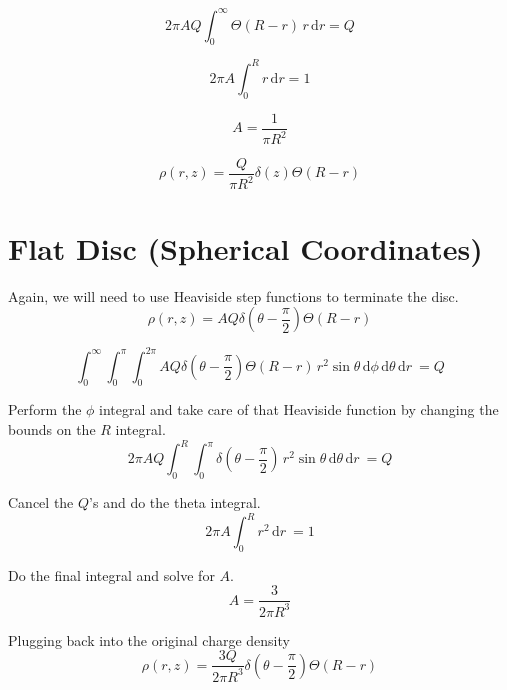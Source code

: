 \documentclass[10pt,a4paper]{article}
\begin{document}
\begin{equation}
2\pi AQ\int_0^\infty \Theta(R-r)\,r\,\mathrm{d}r = Q
\end{equation}

\begin{equation}
2\pi A\int_0^R r\,\mathrm{d}r = 1
\end{equation}

\begin{equation}
A=\frac{1}{\pi R^2}
\end{equation}

\begin{equation}\boxed{
\rho(r, z)=\frac{Q}{\pi R^2}\delta(z)\Theta(R-r)
}\end{equation}

\section{Flat Disc (Spherical Coordinates)}
Again, we will need to use Heaviside step functions to terminate the disc.
\begin{equation}
\rho(r, z)=AQ\delta\left(\theta-\frac{\pi}{2}\right)\Theta(R-r)
\end{equation}

\begin{equation}
\int_0^\infty\int_0^\pi\int_0^{2\pi}AQ\delta\left(\theta-\frac{\pi}{2}\right)\Theta(R-r)\,r^2\sin\theta\,\mathrm{d}\phi\,\mathrm{d}\theta\,\mathrm{d}r\ = Q
\end{equation}

Perform the $\phi$ integral and take care of that Heaviside function by changing the bounds on the $R$ integral.
\begin{equation}
2\pi AQ\int_0^R\int_0^\pi\delta\left(\theta-\frac{\pi}{2}\right)\,r^2\sin\theta\,\mathrm{d}\theta\,\mathrm{d}r\ = Q
\end{equation}

Cancel the $Q$'s and do the theta integral.
\begin{equation}
2\pi A\int_0^R r^2\,\mathrm{d}r\ = 1
\end{equation}

Do the final integral and solve for $A$.
\begin{equation}
A=\frac{3}{2\pi R^3}
\end{equation}

Plugging back into the original charge density
\begin{equation}\boxed{
\rho(r, z)=\frac{3Q}{2\pi R^3}\delta\left(\theta-\frac{\pi}{2}\right)\Theta(R-r)
}\end{equation}
\end{document}
